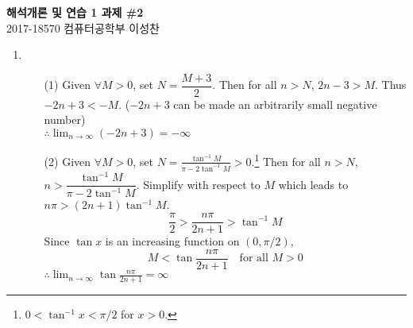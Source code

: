 \documentclass[12pt]{report}
\newcommand{\numl}[1]{\item[\large\textbf{\sffamily #1.}]}
\newcommand{\ds}{\displaystyle}
\begin{document}
\begin{center}
\textbf{\Large 해석개론 및 연습 1 과제 \#2}\\
\large 2017-18570 컴퓨터공학부 이성찬
\end{center}
\begin{enumerate}
\numl{1} 
\begin{enumerate}
	\item[(1)] Given $\forall M > 0$, set $N = \dfrac{M + 3}{2}$. Then for all $n>N$, $2n - 3 > M$. Thus $-2n+3 < -M$. ($-2n+3$ can be made an arbitrarily small negative number)\\ $\ds \therefore \lim_{n\rightarrow \infty} (-2n+3) = -\infty$
	\item[(2)] Given $\forall M > 0$, set $\ds N = \frac{\tan^{-1}M}{\pi - 2\tan^{-1}M} > 0$.\footnote{$0 < \tan^{-1}x < \pi/2$ for $x > 0$.} Then for all $n>N$, $n > \dfrac{\tan^{-1}M}{\pi - 2\tan^{-1}M}$. Simplify with respect to $M$ which leads to $n\pi>(2n+1)\tan^{-1}M$. $$\frac{\pi}{2} > \frac{n\pi}{2n+1} > \tan^{-1}M$$Since $\tan x$ is an increasing function on $(0, \pi/2)$, $$M < \tan{\frac{n\pi}{2n+1}} \quad \text{for all } M > 0$$
	$\therefore \ds \lim_{n\rightarrow \infty} \tan\frac{n\pi}{2n+1} = \infty$
\end{enumerate}


\end{enumerate}
\end{document}

